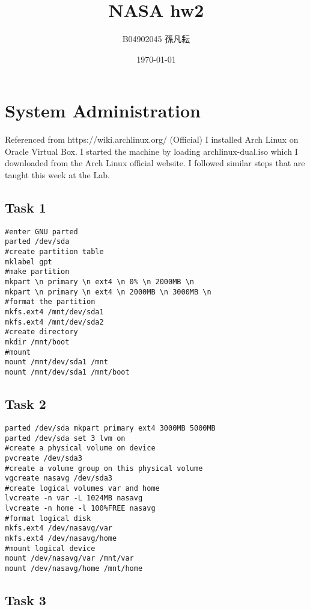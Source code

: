 \documentclass{article}
\title{NASA hw2}
\author{B04902045 孫凡耘}
\date{\today}
\begin{document}
\maketitle
    \section{System Administration}
        Referenced from https://wiki.archlinux.org/ (Official)\newline
        I installed Arch Linux on Oracle Virtual Box.\newline
        I started the machine by loading archlinux-dual.iso which I downloaded from the Arch Linux official website.\newline
        I followed similar steps that are taught this week at the Lab.\newline

        \subsection{Task 1}

\begin{verbatim}
#enter GNU parted
parted /dev/sda
#create partition table
mklabel gpt
#make partition
mkpart \n primary \n ext4 \n 0% \n 2000MB \n
mkpart \n primary \n ext4 \n 2000MB \n 3000MB \n
#format the partition
mkfs.ext4 /mnt/dev/sda1
mkfs.ext4 /mnt/dev/sda2
#create directory
mkdir /mnt/boot
#mount
mount /mnt/dev/sda1 /mnt
mount /mnt/dev/sda1 /mnt/boot
\end{verbatim}

        \subsection{Task 2}

\begin{verbatim}
parted /dev/sda mkpart primary ext4 3000MB 5000MB
parted /dev/sda set 3 lvm on
#create a physical volume on device
pvcreate /dev/sda3
#create a volume group on this physical volume
vgcreate nasavg /dev/sda3
#create logical volumes var and home
lvcreate -n var -L 1024MB nasavg
lvcreate -n home -l 100%FREE nasavg
#format logical disk
mkfs.ext4 /dev/nasavg/var
mkfs.ext4 /dev/nasavg/home
#mount logical device
mount /dev/nasavg/var /mnt/var
mount /dev/nasavg/home /mnt/home
\end{verbatim}

        \subsection{Task 3}
\end{document}
